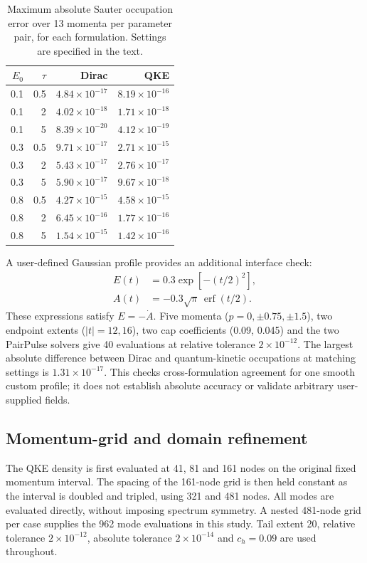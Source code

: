 \documentclass[a4paper,fleqn]{cas-dc}
\begin{document}
\begin{table}[pos=htbp]
\centering\small
\caption{Maximum absolute Sauter occupation error over 13 momenta per parameter pair, for each formulation. Settings are specified in the text.}
\label{tab:parameter}
\begin{tabular}{rrrr}\toprule
$E_0$ & $\tau$ & Dirac & QKE\\\midrule
0.1 & 0.5 & $4.84\times10^{-17}$ & $8.19\times10^{-16}$\\
0.1 & 2 & $4.02\times10^{-18}$ & $1.71\times10^{-18}$\\
0.1 & 5 & $8.39\times10^{-20}$ & $4.12\times10^{-19}$\\
0.3 & 0.5 & $9.71\times10^{-17}$ & $2.71\times10^{-15}$\\
0.3 & 2 & $5.43\times10^{-17}$ & $2.76\times10^{-17}$\\
0.3 & 5 & $5.90\times10^{-17}$ & $9.67\times10^{-18}$\\
0.8 & 0.5 & $4.27\times10^{-15}$ & $4.58\times10^{-15}$\\
0.8 & 2 & $6.45\times10^{-16}$ & $1.77\times10^{-16}$\\
0.8 & 5 & $1.54\times10^{-15}$ & $1.42\times10^{-16}$\\
\bottomrule\end{tabular}
\end{table}

A user-defined Gaussian profile provides an additional interface check:
\begin{align}
E(t)&=0.3\exp[-(t/2)^2],\nonumber\\
A(t)&=-0.3\sqrt{\pi}\,\operatorname{erf}(t/2).
\end{align}
These expressions satisfy $E=-\dot A$. Five momenta ($p=0,\pm0.75,\pm1.5$), two endpoint extents ($|t|=12,16$), two cap coefficients (0.09, 0.045) and the two PairPulse solvers give 40 evaluations at relative tolerance $2\times10^{-12}$. The largest absolute difference between Dirac and quantum-kinetic occupations at matching settings is $1.31\times10^{-17}$. This checks cross-formulation agreement for one smooth custom profile; it does not establish absolute accuracy or validate arbitrary user-supplied fields.

\subsection{Momentum-grid and domain refinement}
\label{sec:densityvalidation}

The QKE density is first evaluated at 41, 81 and 161 nodes on the original fixed momentum interval. The spacing of the 161-node grid is then held constant as the interval is doubled and tripled, using 321 and 481 nodes. All modes are evaluated directly, without imposing spectrum symmetry. A nested 481-node grid per case supplies the 962 mode evaluations in this study. Tail extent 20, relative tolerance $2\times10^{-12}$, absolute tolerance $2\times10^{-14}$ and $c_h=0.09$ are used throughout.
\end{document}

